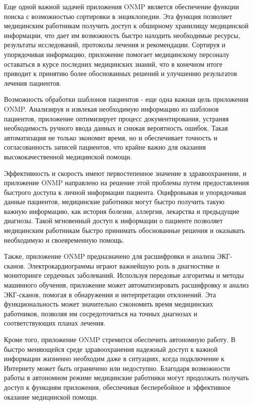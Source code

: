 Еще одной важной задачей приложения ONMP является обеспечение функции поиска с возможностью сортировки в энциклопедии. Эта функция позволяет медицинским работникам получить доступ к обширному хранилищу медицинской информации, что дает им возможность быстро находить необходимые ресурсы, результаты исследований, протоколы лечения и рекомендации. Сортируя и упорядочивая информацию, приложение помогает медицинскому персоналу оставаться в курсе последних медицинских знаний, что в конечном итоге приводит к принятию более обоснованных решений и улучшению результатов лечения пациентов.

Возможность обработки шаблонов пациентов - еще одна важная цель приложения ONMP. Анализируя и извлекая необходимую информацию из шаблонов пациентов, приложение оптимизирует процесс документирования, устраняя необходимость ручного ввода данных и снижая вероятность ошибок. Такая автоматизация не только экономит время, но и обеспечивает точность и согласованность записей пациентов, что крайне важно для оказания высококачественной медицинской помощи.

Эффективность и скорость имеют первостепенное значение в здравоохранении, и приложение ONMP направлено на решение этой проблемы путем предоставления быстрого доступа к личной информации пациента. Оцифровывая и упорядочивая данные пациентов, медицинские работники могут быстро получить такую важную информацию, как история болезни, аллергия, лекарства и предыдущие диагнозы. Такой мгновенный доступ к информации о пациенте позволяет медицинским работникам быстро принимать обоснованные решения и оказывать необходимую и своевременную помощь.

Также, приложение ONMP предназначено для расшифровки и анализа ЭКГ-сканов. Электрокардиограммы играют важнейшую роль в диагностике и мониторинге сердечных заболеваний. Используя передовые алгоритмы и методы машинного обучения, приложение может автоматизировать расшифровку и анализ ЭКГ-сканов, помогая в обнаружении и интерпретации отклонений. Эта функциональность может значительно сэкономить время медицинских работников, позволяя им сосредоточиться на точных диагнозах и соответствующих планах лечения.

Кроме того, приложение ONMP стремится обеспечить автономную работу. В быстро меняющейся среде здравоохранения надежный доступ к важной информации жизненно необходим даже в ситуациях, когда подключение к Интернету может быть ограничено или недоступно. Благодаря возможности работы в автономном режиме медицинские работники могут продолжать получать доступ к функциям приложения, обеспечивая бесперебойное и эффективное оказание медицинской помощи.

